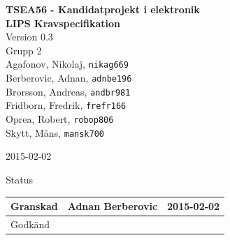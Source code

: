 \documentclass[11pt]{article}
\date{}
\begin{document}
\begin{titlepage}
\begin{center}
{\Large\bfseries TSEA56 - Kandidatprojekt i elektronik \\ LIPS Kravspecifikation}\\
%
\vspace{2\baselineskip}
%
Version 0.3\\
\vspace{2\baselineskip}
%
Grupp 2 \\
Agafonov, Nikolaj, 
\texttt{nikag669}
\\
Berberovic, Adnan, 
\texttt{adnbe196}
\\
Brorsson, Andreas, 
\texttt{andbr981}
\\
Fridborn, Fredrik, 
\texttt{frefr166}
\\
Oprea, Robert, 
\texttt{robop806}
\\
Skytt, Måns, 
\texttt{mansk700}

\vspace{2\baselineskip}
2015-02-02

\vspace{25\baselineskip}
Status
\begin{longtable}{|l|l|l|} \hline

Granskad &
Adnan Berberovic &
2015-02-02 \\ \hline
Godkänd &
 &
 \\ \hline
 
\end{longtable}

\end{center}
\end{titlepage}
\end{document}
